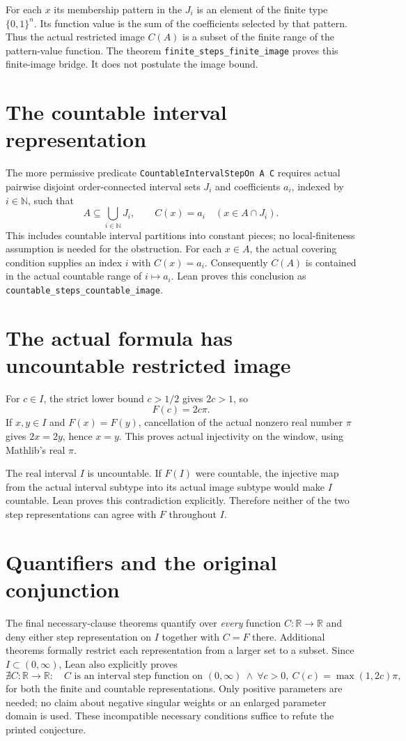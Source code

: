 \documentclass[11pt]{article}
\begin{document}
For each $x$ its membership pattern in the $J_i$ is an element of
the finite type $\{0,1\}^n$. Its function value is the sum of the
coefficients selected by that pattern. Thus the actual restricted
image $C(A)$ is a subset of the finite range of the pattern-value
function. The theorem \texttt{finite\_steps\_finite\_image} proves
this finite-image bridge. It does not postulate the image bound.

\newpage
\section{The countable interval representation}
The more permissive predicate \texttt{CountableIntervalStepOn A C}
requires actual pairwise disjoint order-connected interval sets
$J_i$ and coefficients $a_i$, indexed by $i\in\mathbb N$, such that
\[
 A\subseteq\bigcup_{i\in\mathbb N}J_i,
 \qquad C(x)=a_i\quad(x\in A\cap J_i).
\]
This includes countable interval partitions into constant pieces;
no local-finiteness assumption is needed for the obstruction.
For each $x\in A$, the actual covering condition supplies an index
$i$ with $C(x)=a_i$. Consequently $C(A)$ is contained in the actual
countable range of $i\mapsto a_i$. Lean proves this conclusion as
\texttt{countable\_steps\_countable\_image}.

\section{The actual formula has uncountable restricted image}
For $c\in I$, the strict lower bound $c>1/2$ gives $2c>1$, so
\[
 F(c)=2c\pi.
\]
If $x,y\in I$ and $F(x)=F(y)$, cancellation of the actual nonzero
real number $\pi$ gives $2x=2y$, hence $x=y$. This proves actual
injectivity on the window, using Mathlib's real $\pi$.

The real interval $I$ is uncountable. If $F(I)$ were countable,
the injective map from the actual interval subtype into its actual
image subtype would make $I$ countable. Lean proves this
contradiction explicitly. Therefore neither of the two step
representations can agree with $F$ throughout $I$.

\section{Quantifiers and the original conjunction}
The final necessary-clause theorems quantify over \emph{every}
function $C:\mathbb R\to\mathbb R$ and deny either step
representation on $I$ together with $C=F$ there. Additional theorems
formally restrict each representation from a larger set to a subset.
Since $I\subset(0,\infty)$, Lean also explicitly proves
\[
 \nexists C:\mathbb R\to\mathbb R:\quad
 C\text{ is an interval step function on }(0,\infty)
 \ \land\ \forall c>0,\ C(c)=\max(1,2c)\pi,
\]
for both the finite and countable representations. Only positive
parameters are needed; no claim about negative singular weights or
an enlarged parameter domain is used. These incompatible necessary
conditions suffice to refute the printed conjecture.
\end{document}
